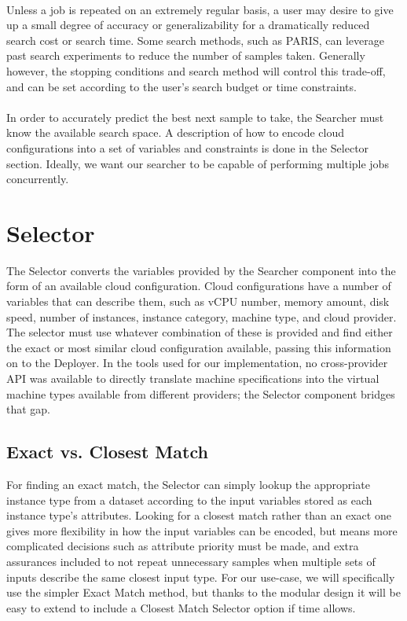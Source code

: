 \documentclass{report}
\begin{document}
\paragraph{}
Unless a job is repeated on an extremely regular basis, a user may desire to give up a small degree of accuracy or generalizability for a dramatically reduced search cost or search time. Some search methods, such as PARIS\cite{Yadwadkar2017}, can leverage past search experiments to reduce the number of samples taken. Generally however, the stopping conditions and search method will control this trade-off, and can be set according to the user's search budget or time constraints. 

\paragraph{}
In order to accurately predict the best next sample to take, the Searcher must know the available search space.  A description of how to encode cloud configurations into a set of variables and constraints is done in the Selector section. Ideally, we want our searcher to be capable of performing multiple jobs concurrently.

\section{Selector}
The Selector converts the variables provided by the Searcher component into the form of an available cloud configuration. Cloud configurations have a number of variables that can describe them, such as vCPU number, memory amount, disk speed, number of instances, instance category, machine type, and cloud provider. The selector must use whatever combination of these is provided and find either the exact or most similar cloud configuration available, passing this information on to the Deployer. In the tools used for our implementation, no cross-provider API was available to directly translate machine specifications into the virtual machine types available from different providers; the Selector component bridges that gap.

\subsection{Exact vs. Closest Match}
For finding an exact match, the Selector can simply lookup the appropriate instance type from a dataset according to the input variables stored as each instance type's attributes. Looking for a closest match rather than an exact one gives more flexibility in how the input variables can be encoded, but means more complicated decisions such as attribute priority must be made, and extra assurances included to not repeat unnecessary samples when multiple sets of inputs describe the same closest input type. For our use-case, we will specifically use the simpler Exact Match method, but thanks to the modular design it will be easy to extend to include a Closest Match Selector option if time allows.
\end{document}

